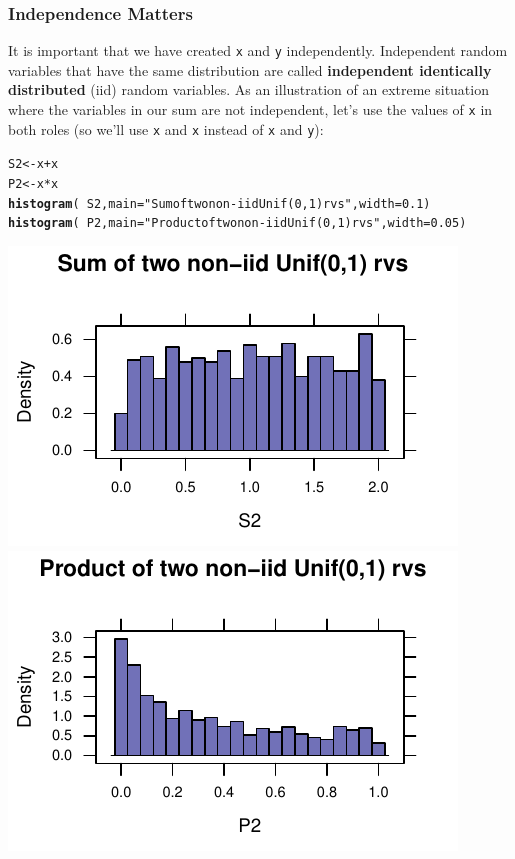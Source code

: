 \documentclass[twoside]{book}\usepackage[]{graphicx}\usepackage[]{xcolor}
\makeatletter
\def\maxwidth{ %
  \ifdim\Gin@nat@width>\linewidth
    \linewidth
  \else
    \Gin@nat@width
  \fi
}
\newcommand{\hlnum}[1]{\textcolor[rgb]{0.686,0.059,0.569}{#1}}%
\newcommand{\hlstr}[1]{\textcolor[rgb]{0.192,0.494,0.8}{#1}}%
\newcommand{\hlopt}[1]{\textcolor[rgb]{0,0,0}{#1}}%
\newcommand{\hlstd}[1]{\textcolor[rgb]{0.345,0.345,0.345}{#1}}%
\newcommand{\hlkwb}[1]{\textcolor[rgb]{0.69,0.353,0.396}{#1}}%
\newcommand{\hlkwc}[1]{\textcolor[rgb]{0.333,0.667,0.333}{#1}}%
\newcommand{\hlkwd}[1]{\textcolor[rgb]{0.737,0.353,0.396}{\textbf{#1}}}%
\newenvironment{kframe}{%
 \def\at@end@of@kframe{}%
 \ifinner\ifhmode%
  \def\at@end@of@kframe{\end{minipage}}%
  \begin{minipage}{\columnwidth}%
 \fi\fi%
 \def\FrameCommand##1{\hskip\@totalleftmargin \hskip-\fboxsep
 \colorbox{shadecolor}{##1}\hskip-\fboxsep
     \hskip-\linewidth \hskip-\@totalleftmargin \hskip\columnwidth}%
 \MakeFramed {\advance\hsize-\width
   \@totalleftmargin\z@ \linewidth\hsize
   \@setminipage}}%
 {\par\unskip\endMakeFramed%
 \at@end@of@kframe}
\newenvironment{knitrout}{}{} %
\def\term#1{\textbf{#1}}
\makeatother
\begin{document}
\subsubsection*{Independence Matters}
It is important that we have created \texttt{x} and \texttt{y} independently.
Independent random variables that have the same distribution are called 
\term{independent identically distributed} (iid) random variables.  As an illustration
of an extreme situation where the variables in our sum are not independent, let's 
use the values of \texttt{x} in both roles (so we'll use \texttt{x} and \texttt{x} instead of \texttt{x} and \texttt{y}):

\begin{knitrout}
\color{fgcolor}\begin{kframe}
\begin{alltt}
\hlstd{S2} \hlkwb{<-} \hlstd{x} \hlopt{+} \hlstd{x}
\hlstd{P2} \hlkwb{<-} \hlstd{x} \hlopt{*} \hlstd{x}
\hlkwd{histogram}\hlstd{(}\hlopt{~}\hlstd{S2,} \hlkwc{main} \hlstd{=} \hlstr{"Sum of two non-iid Unif(0,1) rvs"}\hlstd{,} \hlkwc{width} \hlstd{=} \hlnum{0.1}\hlstd{)}
\hlkwd{histogram}\hlstd{(}\hlopt{~}\hlstd{P2,} \hlkwc{main} \hlstd{=} \hlstr{"Product of two non-iid Unif(0,1) rvs"}\hlstd{,} \hlkwc{width} \hlstd{=} \hlnum{0.05}\hlstd{)}
\end{alltt}
\end{kframe}

{\centering \includegraphics[width=\maxwidth]{figures/fig-sum-product-uniform-non-iid-1} 
\includegraphics[width=\maxwidth]{figures/fig-sum-product-uniform-non-iid-2} 

}



\end{knitrout}
\end{document}
